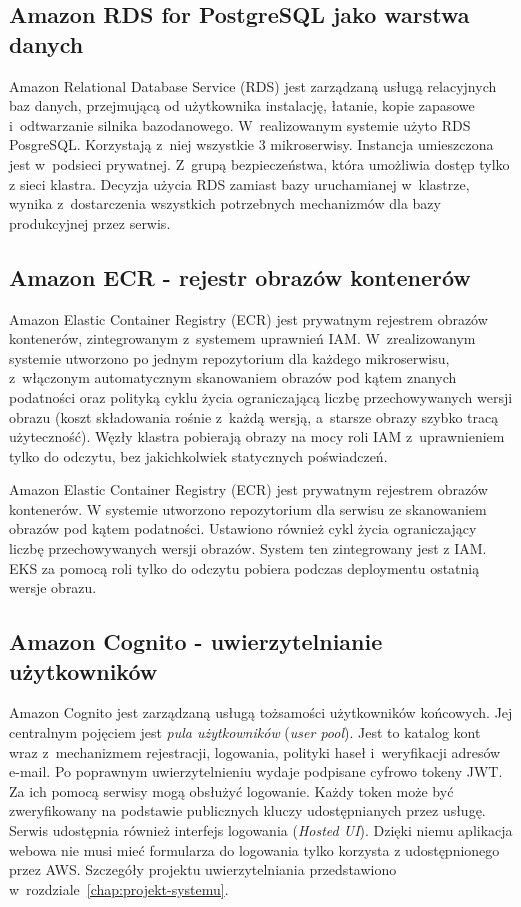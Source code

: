 \subsection{Amazon RDS for PostgreSQL jako warstwa danych}
\label{subsec:rds}

Amazon Relational Database Service (RDS) jest zarządzaną usługą relacyjnych baz danych, przejmującą od użytkownika
instalację, łatanie, kopie zapasowe i~odtwarzanie silnika bazodanowego. W~realizowanym systemie użyto RDS PosgreSQL.
Korzystają z~niej wszystkie 3 mikroserwisy. Instancja umieszczona jest w~podsieci prywatnej. Z~grupą bezpieczeństwa,
która umożliwia dostęp tylko z sieci klastra. Decyzja użycia RDS zamiast bazy uruchamianej w~klastrze, wynika
z~dostarczenia wszystkich potrzebnych mechanizmów dla bazy produkcyjnej przez serwis.

\subsection{Amazon ECR - rejestr obrazów kontenerów}
\label{subsec:ecr}

Amazon Elastic Container Registry (ECR) jest prywatnym rejestrem obrazów kontenerów, zintegrowanym z~systemem
uprawnień IAM. W~zrealizowanym systemie utworzono po jednym repozytorium dla każdego mikroserwisu, z~włączonym
automatycznym skanowaniem obrazów pod kątem znanych podatności oraz polityką cyklu życia ograniczającą liczbę
przechowywanych wersji obrazu (koszt składowania rośnie z~każdą wersją, a~starsze obrazy szybko tracą użyteczność).
Węzły klastra pobierają obrazy na mocy roli IAM z~uprawnieniem tylko do odczytu, bez jakichkolwiek statycznych
poświadczeń.

Amazon Elastic Container Registry (ECR) jest prywatnym rejestrem obrazów kontenerów. W systemie utworzono repozytorium
dla serwisu ze skanowaniem obrazów pod kątem podatności. Ustawiono również cykl życia ograniczający liczbę przechowywanych wersji
obrazów. System ten zintegrowany jest z IAM. EKS za pomocą roli tylko do odczytu pobiera podczas deploymentu ostatnią wersje obrazu.

\subsection{Amazon Cognito - uwierzytelnianie użytkowników}
\label{subsec:cognito}

Amazon Cognito jest zarządzaną usługą tożsamości użytkowników końcowych. Jej centralnym pojęciem jest \emph{pula
użytkowników} (\emph{user pool}). Jest to katalog kont wraz z~mechanizmem rejestracji, logowania, polityki haseł
i~weryfikacji adresów e-mail. Po poprawnym uwierzytelnieniu wydaje podpisane cyfrowo tokeny JWT. Za ich pomocą
serwisy mogą obsłużyć logowanie. Każdy token może być zweryfikowany na podstawie publicznych kluczy udostępnianych
przez usługę. Serwis udostępnia również interfejs logowania (\emph{Hosted UI}). Dzięki niemu aplikacja webowa nie 
musi mieć formularza do logowania tylko korzysta z udostępnionego przez AWS. Szczegóły projektu uwierzytelniania 
przedstawiono w~rozdziale~\ref{chap:projekt-systemu}.

